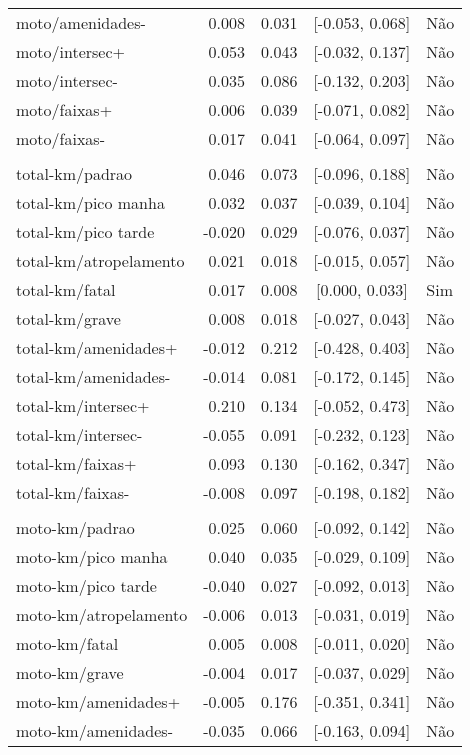 \begin{longtable}{lrrcl}
moto/amenidades- & 0.008 & 0.031 & {}[-0.053, 0.068] & Não\\
moto/intersec+ & 0.053 & 0.043 & {}[-0.032, 0.137] & Não\\
moto/intersec- & 0.035 & 0.086 & {}[-0.132, 0.203] & Não\\
moto/faixas+ & 0.006 & 0.039 & {}[-0.071, 0.082] & Não\\
moto/faixas- & 0.017 & 0.041 & {}[-0.064, 0.097] & Não\\
 &  &  &  & \\
total-km/padrao & 0.046 & 0.073 & {}[-0.096, 0.188] & Não\\
total-km/pico manha & 0.032 & 0.037 & {}[-0.039, 0.104] & Não\\
total-km/pico tarde & -0.020 & 0.029 & {}[-0.076, 0.037] & Não\\
total-km/atropelamento & 0.021 & 0.018 & {}[-0.015, 0.057] & Não\\
total-km/fatal & 0.017 & 0.008 & {}[0.000, 0.033] & Sim\\
total-km/grave & 0.008 & 0.018 & {}[-0.027, 0.043] & Não\\
total-km/amenidades+ & -0.012 & 0.212 & {}[-0.428, 0.403] & Não\\
total-km/amenidades- & -0.014 & 0.081 & {}[-0.172, 0.145] & Não\\
total-km/intersec+ & 0.210 & 0.134 & {}[-0.052, 0.473] & Não\\
total-km/intersec- & -0.055 & 0.091 & {}[-0.232, 0.123] & Não\\
total-km/faixas+ & 0.093 & 0.130 & {}[-0.162, 0.347] & Não\\
total-km/faixas- & -0.008 & 0.097 & {}[-0.198, 0.182] & Não\\
 &  &  &  & \\
moto-km/padrao & 0.025 & 0.060 & {}[-0.092, 0.142] & Não\\
moto-km/pico manha & 0.040 & 0.035 & {}[-0.029, 0.109] & Não\\
moto-km/pico tarde & -0.040 & 0.027 & {}[-0.092, 0.013] & Não\\
moto-km/atropelamento & -0.006 & 0.013 & {}[-0.031, 0.019] & Não\\
moto-km/fatal & 0.005 & 0.008 & {}[-0.011, 0.020] & Não\\
moto-km/grave & -0.004 & 0.017 & {}[-0.037, 0.029] & Não\\
moto-km/amenidades+ & -0.005 & 0.176 & {}[-0.351, 0.341] & Não\\
moto-km/amenidades- & -0.035 & 0.066 & {}[-0.163, 0.094] & Não\\

\end{longtable}
